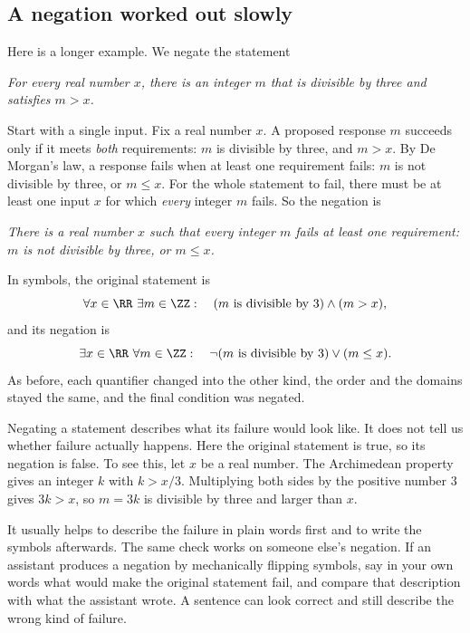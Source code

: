 \subsection*{A negation worked out slowly}
Here is a longer example. We negate the statement
\begin{center}
\emph{For every real number $x$, there is an integer $m$ that is divisible by three and satisfies $m>x$.}
\end{center}
Start with a single input. Fix a real number $x$. A proposed response $m$ succeeds only if it meets \emph{both} requirements: $m$ is divisible by three, and $m>x$. By De Morgan's law, a response fails when at least one requirement fails: $m$ is not divisible by three, or $m\le x$. For the whole statement to fail, there must be at least one input $x$ for which \emph{every} integer $m$ fails. So the negation is
\begin{center}
\emph{There is a real number $x$ such that every integer $m$ fails at least one requirement: $m$ is not divisible by three, or $m\le x$.}
\end{center}
In symbols, the original statement is
\[
\forall x\in\RR\ \exists m\in\ZZ:\quad (m\text{ is divisible by }3)\land(m>x),
\]
and its negation is
\[
\exists x\in\RR\ \forall m\in\ZZ:\quad \neg(m\text{ is divisible by }3)\lor(m\le x).
\]
As before, each quantifier changed into the other kind, the order and the domains stayed the same, and the final condition was negated.

Negating a statement describes what its failure would look like. It does not tell us whether failure actually happens. Here the original statement is true, so its negation is false. To see this, let $x$ be a real number. The Archimedean property gives an integer $k$ with $k>x/3$. Multiplying both sides by the positive number $3$ gives $3k>x$, so $m=3k$ is divisible by three and larger than $x$.

It usually helps to describe the failure in plain words first and to write the symbols afterwards. The same check works on someone else's negation. If an assistant produces a negation by mechanically flipping symbols, say in your own words what would make the original statement fail, and compare that description with what the assistant wrote. A sentence can look correct and still describe the wrong kind of failure.
